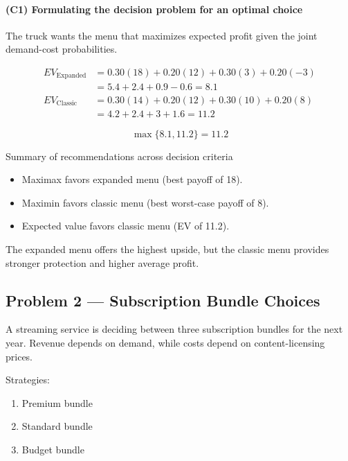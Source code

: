 \paragraph{(C1) Formulating the decision problem for an optimal choice}\label{subsubsec:practice-activity-2-solution-1-c1}

The truck wants the menu that maximizes expected profit given the joint demand-cost probabilities.

\[
\begin{aligned}
EV_{\text{Expanded}} &= 0.30(18) + 0.20(12) + 0.30(3) + 0.20(-3) \\
&= 5.4 + 2.4 + 0.9 - 0.6 = 8.1 \\
EV_{\text{Classic}} &= 0.30(14) + 0.20(12) + 0.30(10) + 0.20(8) \\
&= 4.2 + 2.4 + 3 + 1.6 = 11.2
\end{aligned}
\]

\[
\max\{8.1, 11.2\} = 11.2
\]

Summary of recommendations across decision criteria

\begin{itemize}
	\item Maximax favors expanded menu (best payoff of 18).
	\item Maximin favors classic menu (best worst-case payoff of 8).
	\item Expected value favors classic menu (EV of 11.2).
\end{itemize}

The expanded menu offers the highest upside, but the classic menu provides stronger protection and higher average profit.

\subsection{Problem 2 --- Subscription Bundle Choices}\label{subsec:practice-activity-2-problem-2}

A streaming service is deciding between three subscription bundles for the next year. Revenue depends on demand, while costs
depend on content-licensing prices.

Strategies:

\begin{enumerate}
	\item Premium bundle
	\item Standard bundle
	\item Budget bundle
\end{enumerate}

